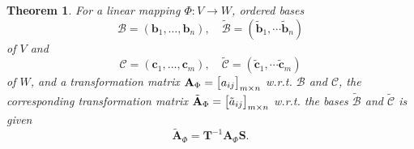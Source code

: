 \documentclass[12pt,openany]{book}
\newtheorem{theorem}{Theorem}[chapter]
\theoremstyle{definition}
\newcommand{\by}{\times}
\begin{document}
	\begin{tcolorbox}[colframe=thmcolor,title={\color{white}\bf Basis Change}]
		\begin{theorem}
			For a linear mapping $\Phi:V\to W$, ordered bases \[
			\mathscr{B}=(\textbf{b}_1,\dots,\textbf{b}_n),\quad\tilde{\mathscr{B}}=(\tilde{\textbf{b}}_1,\cdots\tilde{\textbf{b}}_n)
			\] of \(V\) and \[
			\mathscr{C}=(\textbf{c}_1,\dots,\textbf{c}_m),\quad\tilde{\mathscr{C}}=(\tilde{\textbf{c}}_1,\cdots\tilde{\textbf{c}}_m)
			\] of \(W\), and a transformation matrix \(\textbf{A}_{\Phi}=\sbr[1]{a_{ij}}_{m\by n}\) w.r.t. \(\mathscr{B}\) and \(\mathscr{C}\), the corresponding transformation matrix \(\tilde{\textbf{A}}_\Phi=\sbr[1]{\tilde{a}_{ij}}_{m\by n}\) w.r.t. the bases \(\tilde{\mathscr{B}}\) and \(\tilde{\mathscr{C}}\) is given \[
			\boxed{\tilde{\textbf{A}}_\Phi=\textbf{T}^{-1}\textbf{A}_\Phi \textbf{S}}.
			\]
		\end{theorem}
	\end{tcolorbox}
\end{document}
